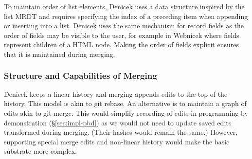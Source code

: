 \documentclass[sigconf]{acmart}
\newcommand{\note}[1]{}
\newcommand{\ident}[1]{{\sffamily #1}}
\begin{document}
To maintain order of list elements, Denicek uses a data structure inspired by the list MRDT
\cite{kaki-2019-mrdts} and requires specifying the index of a preceding item when appending
or inserting into a list. Denicek uses the same mechanism for record fields as the order of fields
may be visible to the user, for example in Webnicek where fields represent children of a HTML node.
Making the order of fields explicit ensures that it is maintained during merging.

%
%


\subsubsection*{Structure and Capabilities of Merging}
Denicek keeps a linear history and merging appends edits to the top of the history.
This model is akin to git rebase. An alternative is to maintain a graph of edits akin
to git merge. This would simplify recording of edits in programming by demonstration
(\S\ref{sec:impl-pbd}) as we would not need to update saved edits transformed
during merging. (Their hashes would remain the same.) However, supporting special
merge edits and non-linear history would make the basic substrate more complex.
\end{document}
